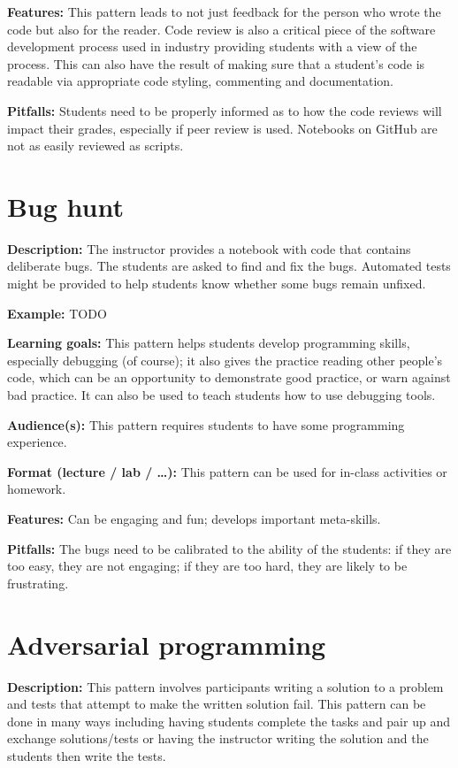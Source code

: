 \documentclass[]{book}
\begin{document}
\textbf{Features:}
This pattern leads to not just feedback for the person who wrote the code but
also for the reader. Code review is also a critical piece of the software
development process used in industry providing students with a view of the
process. This can also have the result of making sure that a student's code is
readable via appropriate code styling, commenting and documentation.

\textbf{Pitfalls:}
Students need to be properly informed as to how the code reviews will impact
their grades, especially if peer review is used. Notebooks on GitHub are not as
easily reviewed as scripts.

\hypertarget{bug-hunt}{%
\section{Bug hunt}\label{bug-hunt}}

\textbf{Description:}
The instructor provides a notebook with code that contains deliberate bugs.
The students are asked to find and fix the bugs. Automated tests might be provided
to help students know whether some bugs remain unfixed.

\textbf{Example:}
TODO

\textbf{Learning goals:}
This pattern helps students develop programming skills, especially debugging (of course);
it also gives the practice reading other people's code, which can be an opportunity
to demonstrate good practice, or warn against bad practice. It can also be used to
teach students how to use debugging tools.

\textbf{Audience(s):}
This pattern requires students to have some programming experience.

\textbf{Format (lecture / lab / \ldots):}
This pattern can be used for in-class activities or homework.

\textbf{Features:}
Can be engaging and fun; develops important meta-skills.

\textbf{Pitfalls:}
The bugs need to be calibrated to the ability of the students: if they are too easy,
they are not engaging; if they are too hard, they are likely to be frustrating.

\hypertarget{adversarial-programming}{%
\section{Adversarial programming}\label{adversarial-programming}}

\textbf{Description:}
This pattern involves participants writing a solution to a problem and tests
that attempt to make the written solution fail. This pattern can be done in
many ways including having students complete the tasks and pair up and exchange
solutions/tests or having the instructor writing the solution and the students
then write the tests.
\end{document}

